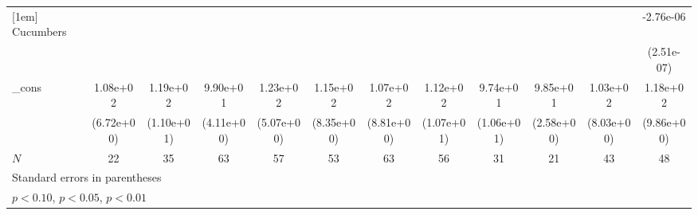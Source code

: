 \begin{table}[htbp]
\begin{tabular}{l*{11}{c}}
[1em]
Cucumbers   &                     &                     &                     &                     &                     &                     &                     &                     &                     &                     &   -2.76e-06\sym{***}\\
            &                     &                     &                     &                     &                     &                     &                     &                     &                     &                     &  (2.51e-07)         \\
[1em]
\_cons      &    1.08e+02\sym{***}&    1.19e+02\sym{***}&    9.90e+01\sym{***}&    1.23e+02\sym{***}&    1.15e+02\sym{***}&    1.07e+02\sym{***}&    1.12e+02\sym{***}&    9.74e+01\sym{***}&    9.85e+01\sym{***}&    1.03e+02\sym{***}&    1.18e+02\sym{***}\\
            &  (6.72e+00)         &  (1.10e+01)         &  (4.11e+00)         &  (5.07e+00)         &  (8.35e+00)         &  (8.81e+00)         &  (1.07e+01)         &  (1.06e+01)         &  (2.58e+00)         &  (8.03e+00)         &  (9.86e+00)         \\
\hline
\(N\)       &          22         &          35         &          63         &          57         &          53         &          63         &          56         &          31         &          21         &          43         &          48         \\
\hline\hline
\multicolumn{12}{l}{\footnotesize Standard errors in parentheses}\\
\multicolumn{12}{l}{\footnotesize \sym{*} \(p<0.10\), \sym{**} \(p<0.05\), \sym{***} \(p<0.01\)}\\
\end{tabular}
\end{table}
